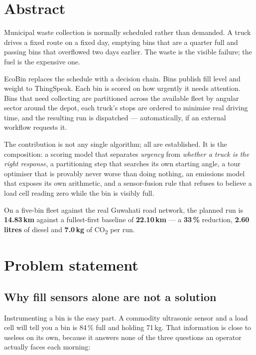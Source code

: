 \documentclass[11pt,a4paper]{article}
\newcommand{\co}{CO\textsubscript{2}}
\begin{document}
\section{Abstract}

Municipal waste collection is normally scheduled rather than demanded. A
truck drives a fixed route on a fixed day, emptying bins that are a
quarter full and passing bins that overflowed two days earlier. The waste
is the visible failure; the fuel is the expensive one.

EcoBin replaces the schedule with a decision chain. Bins publish fill
level and weight to ThingSpeak. Each bin is scored on how urgently it
needs attention. Bins that need collecting are partitioned across the
available fleet by angular sector around the depot, each truck's stops
are ordered to minimise real driving time, and the resulting run is
dispatched --- automatically, if an external workflow requests it.

The contribution is not any single algorithm; all are established. It is
the composition: a scoring model that separates \emph{urgency} from
\emph{whether a truck is the right response}, a partitioning step that
searches its own starting angle, a tour optimiser that is provably never
worse than doing nothing, an emissions model that exposes its own
arithmetic, and a sensor-fusion rule that refuses to believe a load cell
reading zero while the bin is visibly full.

On a five-bin fleet against the real Guwahati road network, the planned
run is \textbf{14.83\,km} against a fullest-first baseline of
\textbf{22.10\,km} --- a \textbf{33\,\%} reduction, \textbf{2.60\,litres}
of diesel and \textbf{7.0\,kg} of \co{} per run.

\section{Problem statement}

\subsection{Why fill sensors alone are not a solution}

Instrumenting a bin is the easy part. A commodity ultrasonic sensor and a
load cell will tell you a bin is 84\,\% full and holding 71\,kg. That
information is close to useless on its own, because it answers none of
the three questions an operator actually faces each morning:
\end{document}
